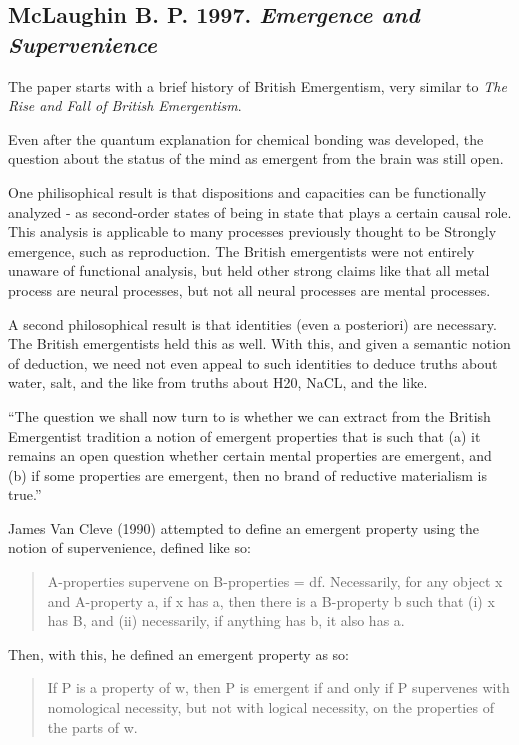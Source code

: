 \documentclass{article}
\newcommand{\ti}[1]{\textit{#1}}
\newcommand{\annbibtitle}[2]{\subsection*{#1. \ti{#2}}}
\begin{document}
\annbibtitle{McLaughin B. P. 1997}{Emergence and Supervenience}

The paper starts with a brief history of British Emergentism, very similar to \ti{The Rise and Fall of British Emergentism}.

Even after the quantum explanation for chemical bonding was developed, the question about the status of the mind as emergent from the brain was still open.

One philisophical result is that dispositions and capacities can be functionally analyzed - as second-order states of being in state that plays a certain causal role. This analysis is applicable to many processes previously thought to be Strongly emergence, such as reproduction. The British emergentists were not entirely unaware of functional analysis, but held other strong claims like that all metal process are neural processes, but not all neural processes are mental processes.

A second philosophical result is that identities (even a posteriori) are necessary. The British emergentists held this as well. With this, and given a semantic notion of deduction, we need not even appeal to such identities to deduce truths about water, salt, and the like from truths about H20, NaCL, and the like.

``The question we shall now turn to is whether we can extract from the British Emergentist tradition a notion of emergent properties that is such that (a) it remains an open question whether certain mental properties are emergent, and (b) if some properties are emergent, then no brand of reductive materialism is true.''

James Van Cleve (1990) attempted to define an emergent property using the notion of supervenience, defined like so:

\begin{quote}
A-properties supervene on B-properties = df. Necessarily, for any object x and A-property a, if x has a, then there is a B-property b such that (i) x has B, and (ii) necessarily, if anything has b, it also has a.
\end{quote}

Then, with this, he defined an emergent property as so:

\begin{quote}
If P is a property of w, then P is emergent if and only if P supervenes with nomological necessity, but not with logical necessity, on the properties of the parts of w.
\end{quote}
\end{document}
